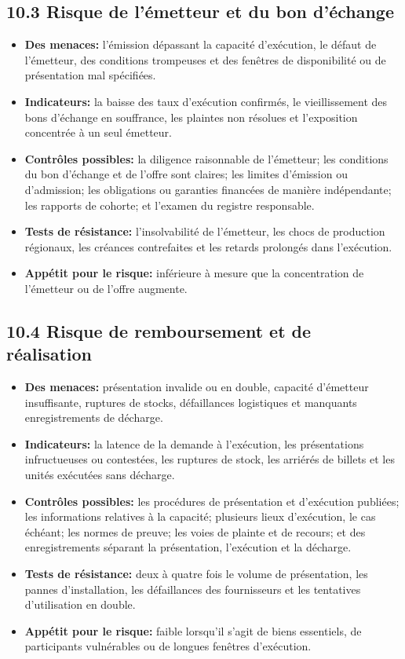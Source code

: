 \documentclass[11pt]{article}
\begin{document}
\subsection*{10.3 Risque de l'émetteur et du bon d'échange}

\begin{itemize}[leftmargin=*]
\item \textbf{Des menaces:} l'émission dépassant la capacité d'exécution, le défaut de l'émetteur, des conditions trompeuses et des fenêtres de disponibilité ou de présentation mal spécifiées.
\item \textbf{Indicateurs:} la baisse des taux d'exécution confirmés, le vieillissement des bons d'échange en souffrance, les plaintes non résolues et l'exposition concentrée à un seul émetteur.
\item \textbf{Contrôles possibles:} la diligence raisonnable de l'émetteur; les conditions du bon d'échange et de l'offre sont claires; les limites d'émission ou d'admission; les obligations ou garanties financées de manière indépendante; les rapports de cohorte; et l'examen du registre responsable.
\item \textbf{Tests de résistance:} l'insolvabilité de l'émetteur, les chocs de production régionaux, les créances contrefaites et les retards prolongés dans l'exécution.
\item \textbf{Appétit pour le risque:} inférieure à mesure que la concentration de l'émetteur ou de l'offre augmente.
\end{itemize}
\subsection*{10.4 Risque de remboursement et de réalisation}

\begin{itemize}[leftmargin=*]
\item \textbf{Des menaces:} présentation invalide ou en double, capacité d'émetteur insuffisante, ruptures de stocks, défaillances logistiques et manquants enregistrements de décharge.
\item \textbf{Indicateurs:} la latence de la demande à l'exécution, les présentations infructueuses ou contestées, les ruptures de stock, les arriérés de billets et les unités exécutées sans décharge.
\item \textbf{Contrôles possibles:} les procédures de présentation et d'exécution publiées; les informations relatives à la capacité; plusieurs lieux d'exécution, le cas échéant; les normes de preuve; les voies de plainte et de recours; et des enregistrements séparant la présentation, l'exécution et la décharge.
\item \textbf{Tests de résistance:} deux à quatre fois le volume de présentation, les pannes d'installation, les défaillances des fournisseurs et les tentatives d'utilisation en double.
\item \textbf{Appétit pour le risque:} faible lorsqu'il s'agit de biens essentiels, de participants vulnérables ou de longues fenêtres d'exécution.
\end{itemize}
\end{document}
